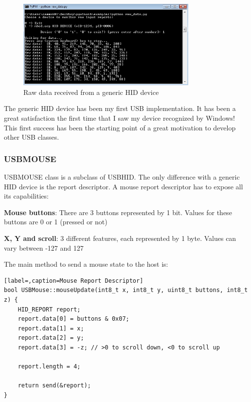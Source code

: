 \documentclass[pdftex,10pt,a4paper]{report}
\newenvironment{packed_item}{
\begin{itemize}
  \setlength{\itemsep}{1pt}
  \setlength{\parskip}{0pt}
  \setlength{\parsep}{0pt}
}{\end{itemize}}
\begin{document}
\begin{figure}[h!]
		\centering
		\includegraphics[width=0.8\textwidth]{./hid_py_raw_data.jpg}
		\caption{Raw data received from a generic HID device}
		\label{Raw data received from a generic HID device}
\end{figure}

The generic HID device has been my first USB implementation. It has been a great satisfaction the first time that I saw my device recognized by Windows! This first success has been the starting point of a great motivation to develop other USB classes. 


\subsubsection{USBMOUSE}
USBMOUSE class is a subclass of USBHID. The only difference with a generic HID device is the report descriptor. A mouse report descriptor has to expose all its capabilities:
\begin{packed_item}
	\item \textbf{Mouse buttons}: There are 3 buttons represented by 1 bit. Values for these buttons are 0 or 1 (pressed or not)
	\item \textbf{X, Y and scroll}: 3 different features, each represented by 1 byte. Values can vary between -127 and 127
\end{packed_item}

The main method to send a mouse state to the host is:
\begin{lstlisting}[label=,caption=Mouse Report Descriptor]
bool USBMouse::mouseUpdate(int8_t x, int8_t y, uint8_t buttons, int8_t z) {
    HID_REPORT report;
    report.data[0] = buttons & 0x07;
    report.data[1] = x;
    report.data[2] = y;
    report.data[3] = -z; // >0 to scroll down, <0 to scroll up

    report.length = 4;

    return send(&report);
}
\end{lstlisting}
\end{document}
